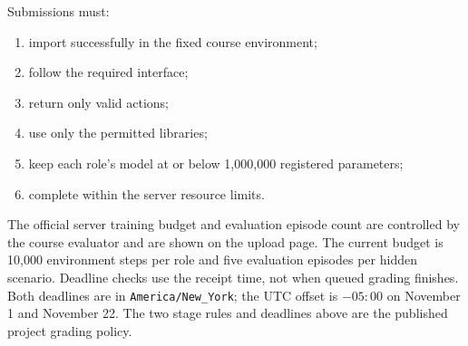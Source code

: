 \documentclass[12pt]{report}
\begin{document}
Submissions must:

\begin{enumerate}[leftmargin=0.3in]
  \item import successfully in the fixed course environment;
  \item follow the required interface;
  \item return only valid actions;
  \item use only the permitted libraries;
  \item keep each role's model at or below 1,000,000 registered parameters;
  \item complete within the server resource limits.
\end{enumerate}

The official server training budget and evaluation episode count are controlled
by the course evaluator and are shown on the upload page. The current budget
is 10,000 environment steps per role and five evaluation episodes per hidden
scenario. Deadline checks use the receipt time, not when queued grading finishes.
Both deadlines are in \texttt{America/New\_York}; the UTC offset is $-05{:}00$
on November 1 and November 22. The two stage rules
and deadlines above are the published project grading policy.
\end{document}
